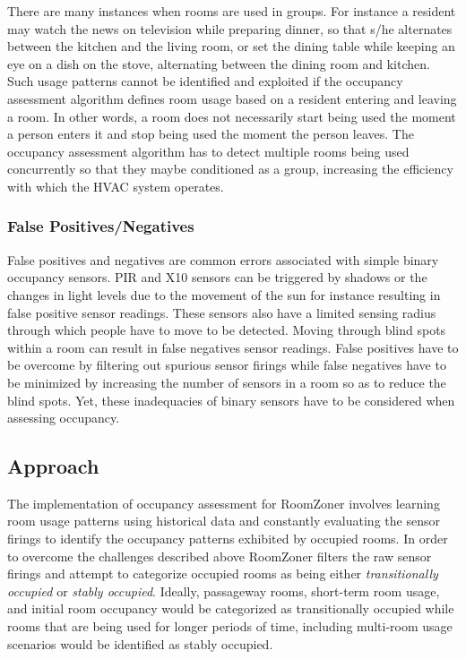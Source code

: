 There are many instances when rooms are used in groups. For instance a resident
may watch the news on television while preparing dinner, so that s/he alternates
between the kitchen and the living room, or set the dining table while keeping
an eye on a dish on the stove, alternating between the dining room and
kitchen. Such usage patterns cannot be identified and exploited if the occupancy
assessment algorithm defines room usage based on a resident entering and leaving
a room. In other words, a room does not necessarily start being used the moment
a person enters it and stop being used the moment the person leaves. The
occupancy assessment algorithm has to detect multiple rooms being used
concurrently so that they maybe conditioned as a group, increasing the
efficiency with which the HVAC system operates.

\subsubsection{False Positives/Negatives}
\label{sec:falsePositives}

False positives and negatives are common errors associated with simple binary
occupancy sensors. PIR and X10 sensors can be triggered by shadows or the
changes in light levels due to the movement of the sun for instance resulting in
false positive sensor readings. These sensors also have a limited sensing radius
through which people have to move to be detected. Moving through blind spots
within a room can result in false negatives sensor readings. False positives
have to be overcome by filtering out spurious sensor firings while false
negatives have to be minimized by increasing the number of sensors in a room so
as to reduce the blind spots. Yet, these inadequacies of binary sensors have to
be considered when assessing occupancy.

\subsection{Approach}
\label{sec:occupancyAssessmentApproach}

The implementation of occupancy assessment for RoomZoner involves learning room
usage patterns using historical data and constantly evaluating the sensor
firings to identify the occupancy patterns exhibited by occupied rooms. In order
to overcome the challenges described above RoomZoner filters the raw sensor
firings and attempt to categorize occupied rooms as being either {\em
transitionally occupied} or {\em stably occupied}. Ideally, passageway rooms,
short-term room usage, and initial room occupancy would be categorized as
transitionally occupied while rooms that are being used for longer periods of
time, including multi-room usage scenarios would be identified as stably
occupied.

